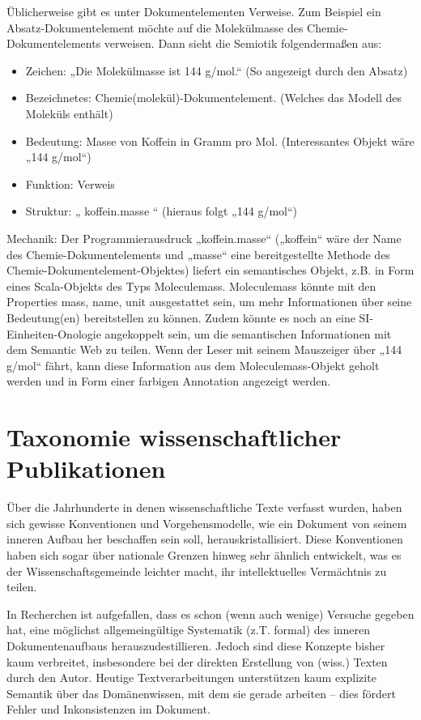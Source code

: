  
Üblicherweise gibt es unter Dokumentelementen Verweise. Zum Beispiel ein Absatz-Dokumentelement möchte auf die Molekülmasse des Chemie-Dokumentelements verweisen. Dann sieht die Semiotik folgendermaßen aus:

 
\begin{itemize}

\item Zeichen: „Die Molekülmasse ist 144 g/mol.“ (So angezeigt durch den Absatz)
\item Bezeichnetes: Chemie(molekül)-Dokumentelement. (Welches das Modell des Moleküls enthält)
\item Bedeutung: Masse von Koffein in Gramm pro Mol. (Interessantes Objekt wäre „144 g/mol“)
\item Funktion: Verweis
\item Struktur: „{ koffein.masse }“ (hieraus folgt „144 g/mol“)
\end{itemize}
 
Mechanik: Der Programmierausdruck „koffein.masse“ („koffein“ wäre der Name des Chemie-Dokumentelements und „masse“ eine bereitgestellte Methode des Chemie-Dokumentelement-Objektes) liefert ein semantisches Objekt, z.B. in Form eines Scala-Objekts des Typs Moleculemass. Moleculemass könnte mit den Properties mass, name, unit ausgestattet sein, um mehr Informationen über seine Bedeutung(en) bereitstellen zu können. Zudem könnte es noch an eine SI-Einheiten-Onologie angekoppelt sein, um die semantischen Informationen mit dem Semantic Web zu teilen. Wenn der Leser mit seinem Mauszeiger über „144 g/mol“ fährt, kann diese Information aus dem Moleculemass-Objekt geholt werden und in Form einer farbigen Annotation angezeigt werden.

 
\section{Taxonomie wissenschaftlicher Publikationen}\label{taxonomie-sec}
 
Über die Jahrhunderte in denen wissenschaftliche Texte verfasst wurden, haben sich gewisse Konventionen und Vorgehensmodelle, wie ein Dokument von seinem inneren Aufbau her beschaffen sein soll, herauskristallisiert. Diese Konventionen haben sich sogar über nationale Grenzen hinweg sehr ähnlich entwickelt, was es der Wissenschaftsgemeinde leichter macht, ihr intellektuelles Vermächtnis zu teilen.

 
In Recherchen ist aufgefallen, dass es schon (wenn auch wenige) Versuche gegeben hat, eine möglichst allgemeingültige Systematik (z.T. formal) des inneren Dokumentenaufbaus herauszudestillieren. Jedoch sind diese Konzepte bisher kaum verbreitet, insbesondere bei der direkten Erstellung von (wiss.) Texten durch den Autor. Heutige Textverarbeitungen unterstützen kaum explizite Semantik über das Domänenwissen, mit dem sie gerade arbeiten -- dies fördert Fehler und Inkonsistenzen im Dokument.


